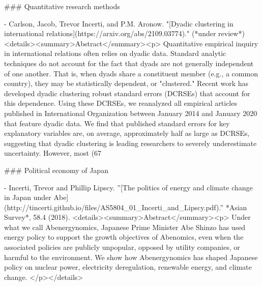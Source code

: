### Quantitative research methods
  
- Carlson, Jacob, Trevor Incerti, and P.M. Aronow. "[Dyadic clustering in international relations](https://arxiv.org/abs/2109.03774)." (*under review*)
   <details><summary>Abstract</summary><p>  Quantitative empirical inquiry in international relations often relies on dyadic data. Standard analytic techniques do not account for the fact that dyads are not generally independent of one another. That is, when dyads share a constituent member (e.g., a common country), they may be statistically dependent, or "clustered." Recent work has developed dyadic clustering robust standard errors (DCRSEs) that account for this dependence. Using these DCRSEs, we reanalyzed all empirical articles published in International Organization between January 2014 and January 2020 that feature dyadic data. We find that published standard errors for key explanatory variables are, on average, approximately half as large as DCRSEs, suggesting that dyadic clustering is leading researchers to severely underestimate uncertainty. However, most (67%
   
### Political economy of Japan

- Incerti, Trevor and Phillip Lipscy. ''[The politics of energy and climate change in Japan under Abe](http://tincerti.github.io/files/AS5804_01_Incerti_and_Lipscy.pdf).'' *Asian Survey*, 58.4 (2018).  
  <details><summary>Abstract</summary><p> Under what we call Abenergynomics, Japanese Prime Minister Abe Shinzo has used energy policy to support the growth objectives of Abenomics, even when the associated policies are publicly unpopular, opposed by utility companies, or harmful to the environment. We show how Abenergynomics has shaped Japanese policy on nuclear power, electricity deregulation, renewable energy, and climate change. </p></details> 

